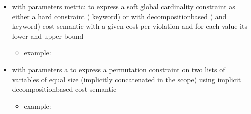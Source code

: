 \documentclass[letterpaper,10pt,openany,oneside,english]{sphinxmanual}
\begin{document}
\begin{itemize}
\begin{itemize}
\begin{sphinxVerbatim}[commandchars=\\\{\}]
  \PYG{p}{[}   \PYG{p}{]}
         
        
           
           
\end{sphinxVerbatim}

\end{itemize}

\item {} 
\sphinxAtStartPar
{} with parameters metric:  to express a soft global cardinality constraint as either a hard constraint ( keyword) or with decomposition\sphinxhyphen{}based ( and  keyword) cost semantic with a given cost per violation and for each value its lower and upper bound
\begin{itemize}
\item {} 
\sphinxAtStartPar
example:

\begin{sphinxVerbatim}[commandchars=\\\{\}]
  \PYG{p}{[}   \PYG{p}{]}
         
        
           
           
           \PYG{p}{[}\PYG{p}{[}  \PYG{p}{]}\PYG{p}{[}  \PYG{p}{]}\PYG{p}{[}  \PYG{p}{]}\PYG{p}{]}
\end{sphinxVerbatim}

\end{itemize}

\item {} 
\sphinxAtStartPar
{} with parameters a  to express a permutation constraint on two lists of variables of equal size (implicitly concatenated in the scope) using implicit decomposition\sphinxhyphen{}based cost semantic
\begin{itemize}
\item {} 
\sphinxAtStartPar
example:


\end{itemize}
\end{itemize}
\end{document}
